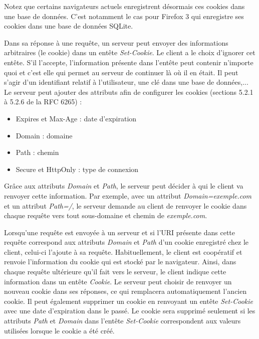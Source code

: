 Notez que certains navigateurs actuels enregistrent désormais ces cookies dans une base de données. C'est notamment le cas pour Firefox 3 qui enregistre ses cookies dans une base de données SQLite.

Dans sa réponse à une requête, un serveur peut envoyer des informations arbitraires (le cookie) dans un entête \textit{Set-Cookie}. Le client a le choix d'ignorer cet entête. S'il l'accepte, l'information présente dans l'entête peut contenir n'importe quoi et c'est elle qui permet au serveur de continuer là où il en était. Il peut s'agir d'un identifiant relatif à l'utilisateur, une clé dans une base de données,...
Le serveur peut ajouter des attributs afin de configurer les cookies (sections 5.2.1 à 5.2.6 de la RFC 6265) \cite{IETF_RFC6265} :

\begin{itemize}
	\item Expires et Max-Age : date d'expiration
	\item Domain : domaine
	\item Path : chemin
	\item Secure et HttpOnly : type de connexion
	\newline
\end{itemize}

Grâce aux attributs \textit{Domain} et \textit{Path}, le serveur peut décider à qui le client va renvoyer cette information. Par exemple, avec un attribut \textit{Domain=exemple.com} et un attribut \textit{Path=/}, le serveur demande au client de renvoyer le cookie dans chaque requête vers tout sous-domaine et chemin de \textit{exemple.com}.
\newline

Lorsqu'une requête est envoyée à un serveur et si l'URI présente dans cette requête correspond aux attributs \textit{Domain} et \textit{Path} d'un cookie enregistré chez le client, celui-ci l'ajoute à sa requête.
Habituellement, le client est coopératif et renvoie l'information du cookie qui est stocké par le navigateur. Ainsi, dans chaque requête ultérieure qu'il fait vers le serveur, le client indique cette information dans un entête \textit{Cookie}. Le serveur peut choisir de renvoyer un nouveau cookie dans ses réponses, ce qui remplacera automatiquement l'ancien cookie. Il peut également supprimer un cookie en renvoyant un entête \textit{Set-Cookie} avec une date d'expiration dans le passé. Le cookie sera supprimé seulement si les attributs \textit{Path} et \textit{Domain} dans l'entête \textit{Set-Cookie} correspondent aux valeurs utilisées lorsque le cookie a été créé.
\newline

